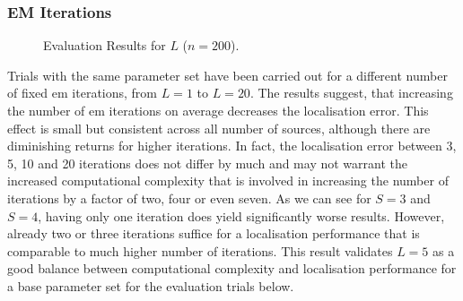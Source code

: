 \subsubsection*{EM Iterations}

\begin{figure}[H]
\iftoggle{quick}{%
   \texttt{[image: plots/boxplots/boxplot-joined-em]}
}{%
   
}
	\caption[Evaluation Results for $L$]{Evaluation Results for $L$ ($n=200$).}
	\label{fig:trialEM}
\end{figure}

Trials with the same parameter set have been carried out for a different number of fixed \gls{em} iterations, from $L=1$ to $L=20$. The results suggest, that increasing the number of \gls{em} iterations on average decreases the localisation error. This effect is small but consistent across all number of sources, although there are diminishing returns for higher iterations. In fact, the localisation error between 3, 5, 10 and 20 iterations does not differ by much and may not warrant the increased computational complexity that is involved in increasing the number of iterations by a factor of two, four or even seven. As we can see for $S=3$ and $S=4$, having only one iteration does yield significantly worse results. However, already two or three iterations suffice for a localisation performance that is comparable to much higher number of iterations. This result validates $L=5$ as a good balance between computational complexity and localisation performance for a base parameter set for the evaluation trials below.

%    
